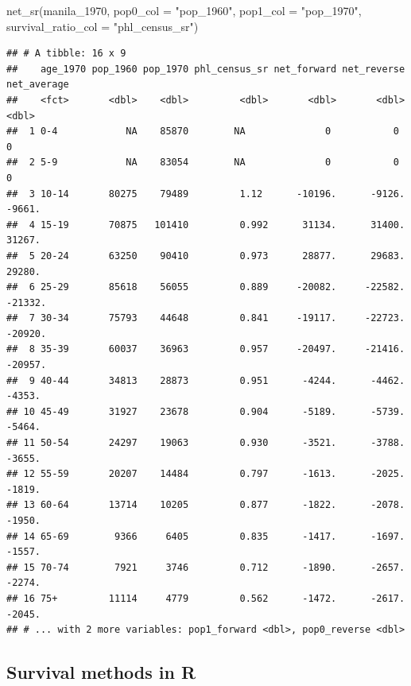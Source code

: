 \documentclass[
]{book}
\newenvironment{Shaded}{\begin{snugshade}}{\end{snugshade}}
\newcommand{\AttributeTok}[1]{\textcolor[rgb]{0.77,0.63,0.00}{#1}}
\newcommand{\FunctionTok}[1]{\textcolor[rgb]{0.00,0.00,0.00}{#1}}
\newcommand{\NormalTok}[1]{#1}
\newcommand{\StringTok}[1]{\textcolor[rgb]{0.31,0.60,0.02}{#1}}
\begin{document}
\begin{Shaded}
\begin{Highlighting}[]
\FunctionTok{net\_sr}\NormalTok{(manila\_1970, }\AttributeTok{pop0\_col =} \StringTok{"pop\_1960"}\NormalTok{, }\AttributeTok{pop1\_col =} \StringTok{"pop\_1970"}\NormalTok{,}
       \AttributeTok{survival\_ratio\_col =} \StringTok{"phl\_census\_sr"}\NormalTok{)}
\end{Highlighting}
\end{Shaded}

\begin{verbatim}
## # A tibble: 16 x 9
##    age_1970 pop_1960 pop_1970 phl_census_sr net_forward net_reverse net_average
##    <fct>       <dbl>    <dbl>         <dbl>       <dbl>       <dbl>       <dbl>
##  1 0-4            NA    85870        NA              0           0           0 
##  2 5-9            NA    83054        NA              0           0           0 
##  3 10-14       80275    79489         1.12      -10196.      -9126.      -9661.
##  4 15-19       70875   101410         0.992      31134.      31400.      31267.
##  5 20-24       63250    90410         0.973      28877.      29683.      29280.
##  6 25-29       85618    56055         0.889     -20082.     -22582.     -21332.
##  7 30-34       75793    44648         0.841     -19117.     -22723.     -20920.
##  8 35-39       60037    36963         0.957     -20497.     -21416.     -20957.
##  9 40-44       34813    28873         0.951      -4244.      -4462.      -4353.
## 10 45-49       31927    23678         0.904      -5189.      -5739.      -5464.
## 11 50-54       24297    19063         0.930      -3521.      -3788.      -3655.
## 12 55-59       20207    14484         0.797      -1613.      -2025.      -1819.
## 13 60-64       13714    10205         0.877      -1822.      -2078.      -1950.
## 14 65-69        9366     6405         0.835      -1417.      -1697.      -1557.
## 15 70-74        7921     3746         0.712      -1890.      -2657.      -2274.
## 16 75+         11114     4779         0.562      -1472.      -2617.      -2045.
## # ... with 2 more variables: pop1_forward <dbl>, pop0_reverse <dbl>
\end{verbatim}

\hypertarget{survival-methods-in-r-4}{%
\subsection{Survival methods in R}\label{survival-methods-in-r-4}}
\end{document}
